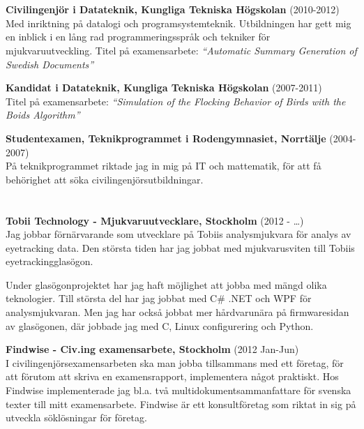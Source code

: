 \documentclass[margin,line]{resume}%
\begin{document}
\begin{resume}
	\section{}\vspace{0.001mm}

	\textbf{Civilingenjör i Datateknik, Kungliga Tekniska Högskolan}
	(2010-2012)\\
	Med inriktning på datalogi och programsystemteknik.
	Utbildningen har gett mig en inblick i en lång rad programmeringsspråk och
	tekniker för mjukvaruutveckling. Titel på examensarbete: \textit{``Automatic Summary Generation of Swedish
	Documents''}

	\textbf{Kandidat i Datateknik, Kungliga Tekniska Högskolan}
	(2007-2011)\\
	Titel på examensarbete: \textit{``Simulation of the Flocking Behavior of
	Birds with the Boids Algorithm''}

	\textbf{Studentexamen, Teknikprogrammet i Rodengymnasiet, Norrtälje} (2004-2007)\\
	På teknikprogrammet riktade jag in mig på IT och mattematik,
	för att få behörighet att söka civilingenjörsutbildningar.

\newpage
	\section{}\vspace{0.001mm}

		\textbf{Tobii Technology - Mjukvaruutvecklare, Stockholm } (2012 - \dots)\\
		Jag jobbar förnärvarande som utvecklare på Tobiis analysmjukvara för analys av
		eyetracking data. Den största tiden har jag jobbat med mjukvarusviten
		till Tobiis eyetrackingglasögon.
		
		Under glasögonprojektet har jag haft möjlighet att jobba med mängd olika
		teknologier. Till största del har jag jobbat med C\# .NET och WPF för
		analysmjukvaran. Men jag har också jobbat mer hårdvarunära på firmwaresidan
		av glasögonen, där jobbade jag med C, Linux configurering och Python.

		\textbf{Findwise - Civ.ing examensarbete, Stockholm } (2012 Jan-Jun)\\
		I civilingenjörsexamensarbeten ska man jobba tillsammans med ett företag, för att
		förutom att skriva en examensrapport, implementera något praktiskt.
		Hos Findwise implementerade jag bl.a. två multidokumentsammanfattare för
		svenska texter till mitt examensarbete. Findwise är ett konsultföretag som
		riktat in sig på utveckla söklösningar för företag.


\end{resume}
\end{document}
